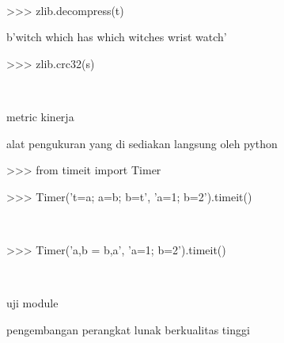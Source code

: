 \documentclass[a4paper,12pt]{report}
\begin{document}
{\fontsize{14pt}{14pt} \\} \par
\vspace{14pt}
\noindent 
{\fontsize{14pt}{14pt}\selectfont >>> zlib.decompress(t) \\} \par
\noindent 
{\fontsize{14pt}{14pt}\selectfont b'witch which has which witches wrist watch' \\} \par
\vspace{14pt}
\noindent 
{\fontsize{14pt}{14pt}\selectfont >>> zlib.crc32(s) \\} \par
\noindent 
{\fontsize{14pt}{14pt} \\} \par
\vspace{14pt}
\noindent 
{\fontsize{14pt}{14pt}\selectfont metric kinerja \\} \par
\noindent 
{\fontsize{14pt}{14pt}\selectfont alat pengukuran yang di sediakan langsung oleh python \\} \par
\vspace{14pt}
\noindent 
{\fontsize{14pt}{14pt}\selectfont >>> from timeit import Timer \\} \par
\vspace{14pt}
\noindent 
{\fontsize{14pt}{14pt}\selectfont >>> Timer('t=a; a=b; b=t', 'a=1; b=2').timeit() \\} \par
\noindent 
{\fontsize{14pt}{14pt} \\} \par
\vspace{14pt}
\noindent 
{\fontsize{14pt}{14pt}\selectfont >>> Timer('a,b = b,a', 'a=1; b=2').timeit() \\} \par
\noindent 
{\fontsize{14pt}{14pt} \\} \par
\vspace{14pt}
\noindent 
{\fontsize{14pt}{14pt}\selectfont uji module  \\} \par
\noindent 
{\fontsize{14pt}{14pt}\selectfont pengembangan perangkat lunak berkualitas tinggi \\} \par
\end{document}
